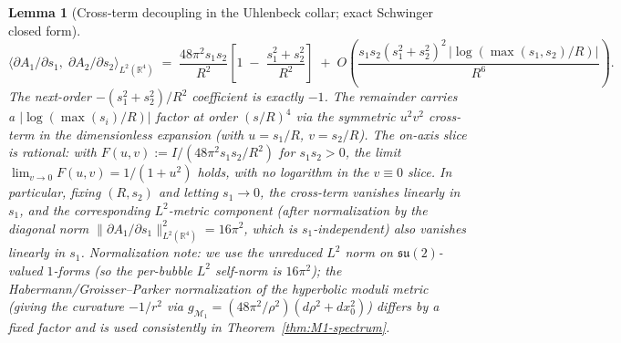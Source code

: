 \documentclass[11pt,letterpaper]{article}
\newtheorem{lemma}[theorem]{Lemma}
\theoremstyle{definition}
\newcommand{\bbR}{\mathbb{R}}
\newcommand{\cM}{\mathcal{M}}
\begin{document}
\begin{lemma}[Cross-term decoupling in the Uhlenbeck collar; exact Schwinger closed form]
\begin{equation}\label{eq:lemma-asymptotic}
\langle \partial A_1/\partial s_1,\;\partial A_2/\partial s_2\rangle_{L^2(\bbR^4)}
\;=\; \frac{48\pi^2 s_1 s_2}{R^2}\left[1 \;-\; \frac{s_1^2 + s_2^2}{R^2}\right] \;+\; O\!\left(\frac{s_1 s_2 (s_1^2 + s_2^2)^2\,\bigl|\log(\max(s_1,s_2)/R)\bigr|}{R^6}\right).
\end{equation}
The next-order $-(s_1^2+s_2^2)/R^2$ coefficient is exactly $-1$. The remainder carries a $|\log(\max(s_i)/R)|$ factor at order $(s/R)^4$ via the symmetric $u^2 v^2$ cross-term in the dimensionless expansion (with $u = s_1/R$, $v = s_2/R$). The on-axis slice is rational: with $F(u,v) := I/(48\pi^2 s_1 s_2/R^2)$ for $s_1 s_2 > 0$, the limit $\lim_{v\to 0} F(u, v) = 1/(1+u^2)$ holds, with no logarithm in the $v\equiv 0$ slice. In particular, fixing $(R, s_2)$ and letting $s_1 \to 0$, the cross-term vanishes \emph{linearly} in $s_1$, and the corresponding $L^2$-metric component (after normalization by the diagonal norm $\|\partial A_1/\partial s_1\|^2_{L^2(\bbR^4)} = 16\pi^2$, which is $s_1$-independent) also vanishes linearly in $s_1$. \emph{Normalization note:} we use the unreduced $L^2$ norm on $\mathfrak{su}(2)$-valued $1$-forms (so the per-bubble $L^2$ self-norm is $16\pi^2$); the Habermann/Groisser--Parker normalization of the hyperbolic moduli metric (giving the curvature $-1/r^2$ via $g_{\cM_1} = (48\pi^2/\rho^2)(d\rho^2 + dx_0^2)$) differs by a fixed factor and is used consistently in Theorem~\ref{thm:M1-spectrum}.
\end{lemma}
\end{document}
